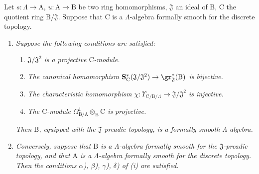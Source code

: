 \begin{theorem}[22.1.1]
\label{0.22.1.1}
Let $s:\Lambda\to\mathrm{A}$, $u:\mathrm{A}\to\mathrm{B}$ be two ring homomorphisms, $\mathfrak{J}$ an ideal of $\mathrm{B}$, $\mathrm{C}$ the quotient ring $\mathrm{B}/\mathfrak{J}$.
Suppose that $\mathrm{C}$ is a $\Lambda$-algebra formally smooth for the discrete topology.
\begin{enumerate}
  \item[\rm{(i)}] \emph{Suppose the following conditions are satisfied:}
  \begin{enumerate}
    \item[$\alpha$)] $\mathfrak{J}/\mathfrak{J}^2$ \emph{is a projective $\mathrm{C}$-module.}
    \item[$\beta$)] \emph{The canonical homomorphism $\mathbf{S}^*_\mathrm{C}(\mathfrak{J}/\mathfrak{J}^2)\to\gr^*_\mathfrak{J}(\mathrm{B})$  is bijective.}
    \item[$\gamma$)] \emph{The characteristic homomorphism $\chi:\Upsilon_{\mathrm{C}/\mathrm{B}/\Lambda}\to\mathfrak{J}/\mathfrak{J}^2$  is injective.}
    \item[$\delta$)] \emph{The $\mathrm{C}$-module $\Omega^1_{\mathrm{B}/\mathrm{A}}\otimes_\mathrm{B}\mathrm{C}$ is projective.}
  \end{enumerate}
  \emph{Then $\mathrm{B}$, equipped with the $\mathfrak{J}$-preadic topology, is a formally smooth $\Lambda$-algebra.}
  \item[\rm{(ii)}] \emph{Conversely, suppose that $\mathrm{B}$ is a $\Lambda$-algebra formally smooth for the $\mathfrak{J}$-preadic topology, and that $\mathrm{A}$ is a $\Lambda$-algebra formally smooth for the discrete topology.
  Then the conditions $\alpha$), $\beta$), $\gamma$), $\delta$) of \rm{(i)} are satisfied.}
\end{enumerate}
\end{theorem}

